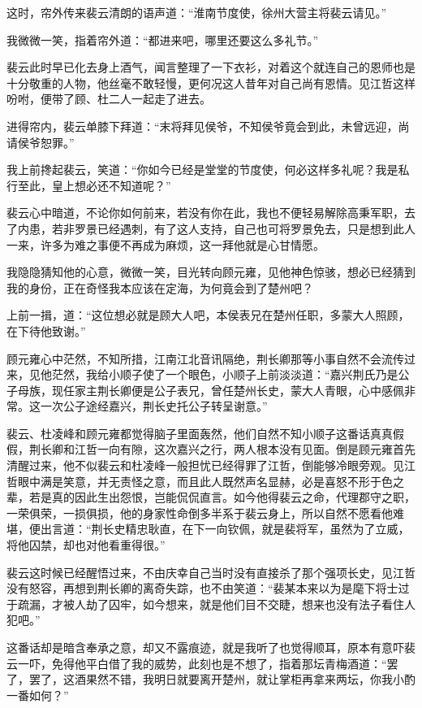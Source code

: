 这时，帘外传来裴云清朗的语声道：“淮南节度使，徐州大营主将裴云请见。”

我微微一笑，指着帘外道：“都进来吧，哪里还要这么多礼节。”

裴云此时早已化去身上酒气，闻言整理了一下衣衫，对着这个就连自己的恩师也是十分敬重的人物，他丝毫不敢轻慢，更何况这人昔年对自己尚有恩情。见江哲这样吩咐，便带了顾、杜二人一起走了进去。

进得帘内，裴云单膝下拜道：“末将拜见侯爷，不知侯爷竟会到此，未曾远迎，尚请侯爷恕罪。”

我上前搀起裴云，笑道：“你如今已经是堂堂的节度使，何必这样多礼呢？我是私行至此，皇上想必还不知道呢？”

裴云心中暗道，不论你如何前来，若没有你在此，我也不便轻易解除高秉军职，去了内患，若非罗景已经遇刺，有了这人支持，自己也可将罗景免去，只是想到此人一来，许多为难之事便不再成为麻烦，这一拜他就是心甘情愿。

我隐隐猜知他的心意，微微一笑，目光转向顾元雍，见他神色惊骇，想必已经猜到我的身份，正在奇怪我本应该在定海，为何竟会到了楚州吧？

上前一揖，道：“这位想必就是顾大人吧，本侯表兄在楚州任职，多蒙大人照顾，在下待他致谢。”

顾元雍心中茫然，不知所措，江南江北音讯隔绝，荆长卿那等小事自然不会流传过来，见他茫然，我给小顺子使了一个眼色，小顺子上前淡淡道：“嘉兴荆氏乃是公子母族，现任家主荆长卿便是公子表兄，曾任楚州长史，蒙大人青眼，心中感佩非常。这一次公子途经嘉兴，荆长史托公子转呈谢意。”

裴云、杜凌峰和顾元雍都觉得脑子里面轰然，他们自然不知小顺子这番话真真假假，荆长卿和江哲一向有隙，这次嘉兴之行，两人根本没有见面。倒是顾元雍首先清醒过来，他不似裴云和杜凌峰一般担忧已经得罪了江哲，倒能够冷眼旁观。见江哲眼中满是笑意，并无责怪之意，而且此人既然声名显赫，必是喜怒不形于色之辈，若是真的因此生出怨恨，岂能侃侃直言。如今他得裴云之命，代理郡守之职，一荣俱荣，一损俱损，他的身家性命倒多半系于裴云身上，所以自然不愿看他难堪，便出言道：“荆长史精忠耿直，在下一向钦佩，就是裴将军，虽然为了立威，将他囚禁，却也对他看重得很。”

裴云这时候已经醒悟过来，不由庆幸自己当时没有直接杀了那个强项长史，见江哲没有怒容，再想到荆长卿的离奇失踪，也不由笑道：“裴某本来以为是麾下将士过于疏漏，才被人劫了囚牢，如今想来，就是他们目不交睫，想来也没有法子看住人犯吧。”

这番话却是暗含奉承之意，却又不露痕迹，就是我听了也觉得顺耳，原本有意吓裴云一吓，免得他平白借了我的威势，此刻也是不想了，指着那坛青梅酒道：“罢了，罢了，这酒果然不错，我明日就要离开楚州，就让掌柜再拿来两坛，你我小酌一番如何？”

